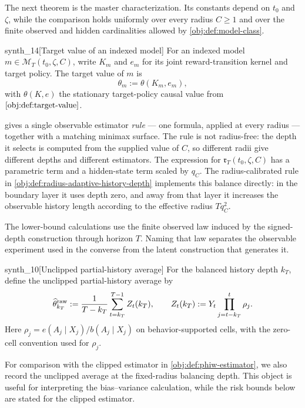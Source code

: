 \documentclass[11pt]{article}
\begin{document}
The next theorem is the master characterization. Its constants depend on \(t_0\) and \(\zeta\), while the comparison holds uniformly over every radius \(C\ge1\) and over the finite observed and hidden cardinalities allowed by \cref{obj:def:model-class}.

\begin{definitionv}{synth_14}[Target value of an indexed model]
For an indexed model \(m\in\mathcal M_T(t_0,\zeta,C)\), write \(K_m\) and \(e_m\) for its joint reward-transition kernel and target policy. The target value of \(m\) is
\[
\theta_m:=\theta(K_m,e_m),
\]
with \(\theta(K,e)\) the stationary target-policy causal value from \(\cref{obj:def:target-value}\).
\end{definitionv}

 gives a single observable estimator \emph{rule} --- one formula, applied at every radius --- together with a matching minimax surface. The rule is not radius-free: the depth it selects is computed from the supplied value of \(C\), so different radii give different depths and different estimators. The expression for \(\mathfrak r_T(t_0,\zeta,C)\) has a parametric term and a hidden-state term scaled by \(q_C\). The radius-calibrated rule in \cref{obj:def:radius-adaptive-history-depth} implements this balance directly: in the boundary layer it uses depth zero, and away from that layer it increases the observable history length according to the effective radius \(Tq_C^2\).

The lower-bound calculations use the finite observed law induced by the signed-depth construction through horizon \(T\). Naming that law separates the observable experiment used in the converse from the latent construction that generates it.

\begin{definitionv}{synth_10}[Unclipped partial-history average]
For the balanced history depth \(k_T\), define the unclipped partial-history average by
\[
\widehat\theta^{\rm raw}_{k_T}
:=
\frac{1}{T-k_T}\sum_{t=k_T}^{T-1} Z_t(k_T),
\qquad
Z_t(k_T):=
Y_t\prod_{j=t-k_T}^{t}\rho_j .
\]
Here \(\rho_j=e(A_j\mid X_j)/b(A_j\mid X_j)\) on behavior-supported cells, with the zero-cell convention used for \(\rho_j\).
\end{definitionv}

For comparison with the clipped estimator in \cref{obj:def:phiw-estimator}, we also record the unclipped average at the fixed-radius balancing depth. This object is useful for interpreting the bias--variance calculation, while the risk bounds below are stated for the clipped estimator.
\end{document}
